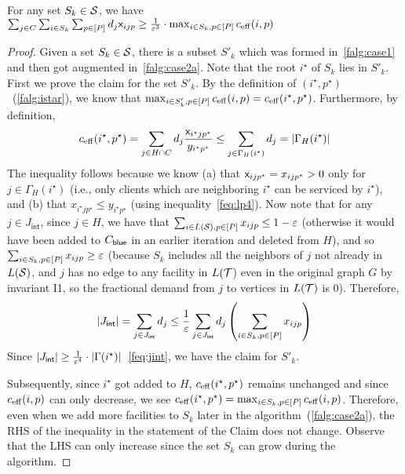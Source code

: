 \begin{claim}\label{fclm:imp}
For any set $S_k \in {\cal S}$, we have  $\sum_{j\in C} \sum_{i\in S_k}  \sum_{p\in [P]} d_j {\mathsf x}_{ijp} \geq \frac{1}{\varepsilon^3}\cdot \max_{i\in S_k, p\in [P]} c_{\mathrm{eff}}(i,p) $
\end{claim}
\begin{proof}
Given a set $S_k \in {\cal S}$, there is a subset $S'_k$ which was formed in~\cref{falg:case1} and then got augmented in~\cref{falg:case2a}.
Note that the root $i^\star$ of $S_k$ lies in $S'_k$. First we prove the claim for the set $S'_k$.
By the definition of $(i^\star, p^\star)$~(\cref{falg:istar}), we know that $ \max_{i\in S'_k, p\in [P]} c_{\mathrm{eff}}(i,p)  = c_{\mathrm{eff}}(i^\star,p^\star)$.%
Furthermore, by definition,
\[c_{\mathrm{eff}}(i^\star,p^\star) = \sum_{j\in H\cap C} d_j \frac{{\mathsf x}_{i^\star jp^\star}}{y_{i^\star p^\star}} \leq \sum_{j\in \Gamma_H(i^\star)} d_j = |\Gamma_H(i^\star)|\]
The inequality follows because we know  (a) that ${\mathsf x}_{ijp^\star} = x_{ijp^\star} > 0$ only for $j\in \Gamma_H(i^\star)$ (i.e., only clients which are neighboring $i^\star$ can be serviced by $i^\star$), and (b) that $x_{i^\star jp^\star} \leq y_{i^\star p^\star}$ (using inequality~\eqref{feq:lp4}).
Now note that for any $j\in J_\mathsf{int}$, since $j\in H$, we have that $\sum_{i\in L({\cal S}), p\in [P]} x_{ijp} \leq 1 - \varepsilon$ (otherwise it would have been added
to $C_{\mathsf{blue}}$ in an earlier iteration and deleted from $H$), and so $\sum_{i\in S_k, p\in [P]} x_{ijp} \geq \varepsilon$ (because $S_k$ includes all the neighbors of $j$ not already in $L({\cal S})$, and $j$ has no edge to any facility in $L({\cal T}$) even in the original graph $G$ by invariant I1, so the fractional demand from $j$ to vertices in $L({\cal T})$ is $0$).
Therefore,
\[
|J_\mathsf{int}| = \sum_{j\in J_\mathsf{int}} d_j  \leq \frac{1}{\varepsilon} \sum_{j\in J_\mathsf{int}} d_j \left(\sum_{i\in S_k, p\in [P]} x_{ijp}\right)
\]
Since  $|J_\mathsf{int}| \geq \frac{1}{\varepsilon^4}\cdot |\Gamma(i^\star)| $~\eqref{feq:jint}, we have the claim for $S'_k$.

	Subsequently, since $i^\star$ got added to $H$, $c_{\mathrm{eff}}(i^\star,p^\star)$ remains unchanged and since $c_{\mathrm{eff}}(i,p)$ can only decrease, we see $c_{\mathrm{eff}}(i^\star,p^\star) =  \max_{i\in S_k,p\in [P]} c_{\mathrm{eff}}(i,p)$.
	Therefore, even when we add more facilities
	to $S_k$ later in the algorithm~(\cref{falg:case2a}), the RHS of the inequality in the statement of the Claim does not change.
	Observe that the LHS can only increase since the set $S_k$ can grow during the algorithm. \end{proof}


